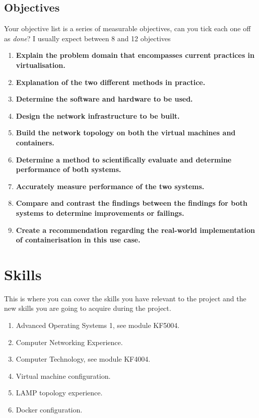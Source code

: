 \subsection{Objectives}
Your objective list is a series of measurable objectives, can you tick each one off as \emph{done}?  I usually expect between 8 and 12 objectives

\begin{enumerate}
	\item \textbf{Explain the problem domain that encompasses current practices in virtualisation.}
	\item \textbf{Explanation of the two different methods in practice.}
	\item \textbf{Determine the software and hardware to be used.}
	\item \textbf{Design the network infrastructure to be built.}
	\item \textbf{Build the network topology on both the virtual machines and containers.}
	\item \textbf{Determine a method to scientifically evaluate and determine performance of both systems.}
	\item \textbf{Accurately measure performance of the two systems.}
	\item \textbf{Compare and contrast the findings between the findings for both systems to determine improvements or failings.}
	\item \textbf{Create a recommendation regarding the real-world implementation of containerisation in this use case.}

\end{enumerate}

\section{Skills}
This is where you can cover the skills you have relevant to the project and the new skills you are going to acquire during the project.
\begin{enumerate}
	\item Advanced Operating Systems 1, see module KF5004.
	\item Computer Networking Experience.
	\item Computer Technology, see module KF4004.
	\item Virtual machine configuration.
	\item LAMP topology experience.
	\item Docker configuration.
\end{enumerate}

